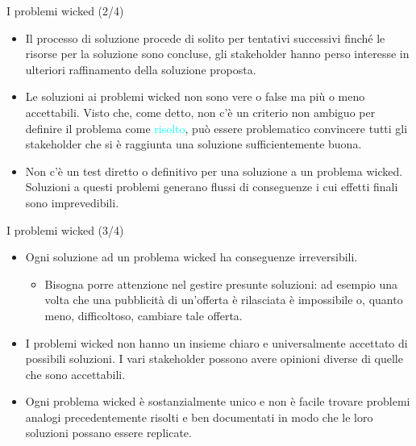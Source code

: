 \documentclass{beamer}
\begin{document}

\begin{frame}{\centerline{I problemi wicked (2/4)}}

\small
\begin{itemize}
\item Il processo di soluzione procede di solito per tentativi successivi finch\'{e} le risorse per la soluzione sono concluse, gli stakeholder hanno perso interesse in ulteriori raffinamento della soluzione proposta.

\item Le soluzioni ai problemi wicked non sono vere o false ma pi\`{u} o meno accettabili. Visto che, come detto, non c'\`{e} un criterio non ambiguo per definire il problema come \textcolor{cyan}{risolto}, pu\`{o} essere problematico convincere tutti gli stakeholder che si \`{e} raggiunta una soluzione sufficientemente buona.

\item Non c'\`{e} un test diretto o definitivo per una soluzione a un problema wicked. Soluzioni a questi problemi generano flussi di conseguenze i cui effetti finali sono imprevedibili.


\end{itemize}

\end{frame}

\begin{frame}{\centerline{I problemi wicked (3/4)}}

\small
\begin{itemize}
\item Ogni soluzione ad un problema wicked ha conseguenze irreversibili. 
\begin{itemize}
\item Bisogna porre attenzione nel gestire presunte soluzioni: ad esempio una volta che una pubblicit\`{a} di un'offerta \`{e} rilasciata \`{e} impossibile o, quanto meno, difficoltoso, cambiare tale offerta.
\end{itemize}

\item I problemi wicked non hanno un insieme chiaro e universalmente accettato di possibili soluzioni. I vari stakeholder possono avere opinioni diverse di quelle che sono accettabili.

\item Ogni problema wicked \`{e} sostanzialmente unico e non \`{e} facile trovare problemi analogi precedentemente risolti e ben documentati in modo che le loro soluzioni possano essere replicate.

\end{itemize}

\end{frame}
\end{document}
